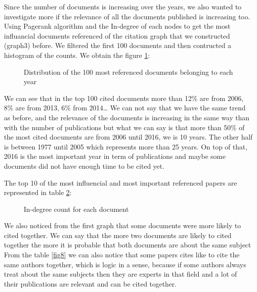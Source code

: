 \documentclass[article,twocolumn]{IEEEtran}
\begin{document}
    Since the number of documents is increasing over the years, we also
wanted to investigate more if the relevance of all the documents
published is increasing too. Using Pagerank algorithm and the In-degree
of each nodes to get the most influancial documents referenced of the
citation graph that we constructed (graph3) before. We filtered the
first 100 documents and then contructed a histogram of the counts. We
obtain the figure \ref{fig7}:


    \begin{figure}
        \begin{center}\end{center}
        \caption{Distribution of the 100 most referenced documents belonging to each year}
        \label{fig7}
    \end{figure}
    
    We can see that in the top 100 cited documents more than 12\% are from
2006, 8\% are from 2013, 6\% from 2014\ldots{} We can not say that we
have the same trend as before, and the relevance of the documents is
increasing in the same way than with the number of publications but what
we can say is that more than 50\% of the most cited documents are from
2006 until 2016, we is 10 years. The other half is between 1977 until
2005 which represents more than 25 years. On top of that, 2016 is the
most important year in term of publications and maybe some documents did
not have enough time to be cited yet.

    The top 10 of the most influencial and most important referenced papers
are represented in table \ref{indegree}:


    \begin{figure}
        \begin{center}\end{center}
        \caption{In-degree count for each document}
        \label{indegree}
    \end{figure}
    
    We also noticed from the first graph that some documents were more
likely to cited together. We can say that the more two documents are
likely to cited together the more it is probable that both documents are
about the same subject From the table \ref{fig8} we can also notice that
some papers cites like to cite the same authors together, which is logic
in a sense, because if some authors always treat about the same subjects
then they are experts in that field and a lot of their publications are
relevant and can be cited together.
\end{document}
